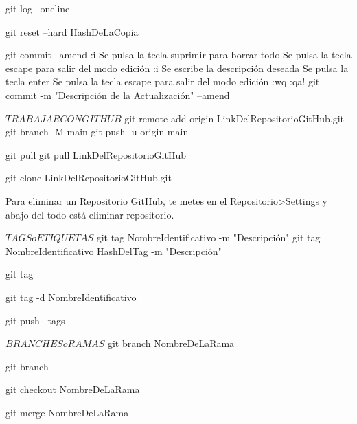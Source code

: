 	git log --oneline	%

	git reset --hard HashDeLaCopia	%

	git commit --amend		%
		:i		%
		Se pulsa la tecla suprimir para borrar todo
		Se pulsa la tecla escape para salir del modo edición
		:i		%
		Se escribe la descripción deseada
		Se pulsa la tecla enter
		Se pulsa la tecla escape para salir del modo edición
		:wq		%
		:qa!	%
	git commit -m "Descripción de la Actualización" --amend		%



$ TRABAJAR CON GITHUB $
	git remote add origin LinkDelRepositorioGitHub.git		%
	git branch -M main
	git push -u origin main									%

	git pull							%
	git pull LinkDelRepositorioGitHub	%

	git clone LinkDelRepositorioGitHub.git		%

	Para eliminar un Repositorio GitHub, te metes en el Repositorio>Settings y abajo del todo está eliminar repositorio.



$ TAGS o ETIQUETAS $
	git tag NombreIdentificativo -m "Descripción"				%
	git tag NombreIdentificativo HashDelTag -m "Descripción"	%

	git tag		%

	git tag -d NombreIdentificativo		%

	git push --tags		%


$ BRANCHES o RAMAS $
	git branch NombreDeLaRama	%
	
	git branch					%

	git checkout NombreDeLaRama	%

	git merge NombreDeLaRama	%




